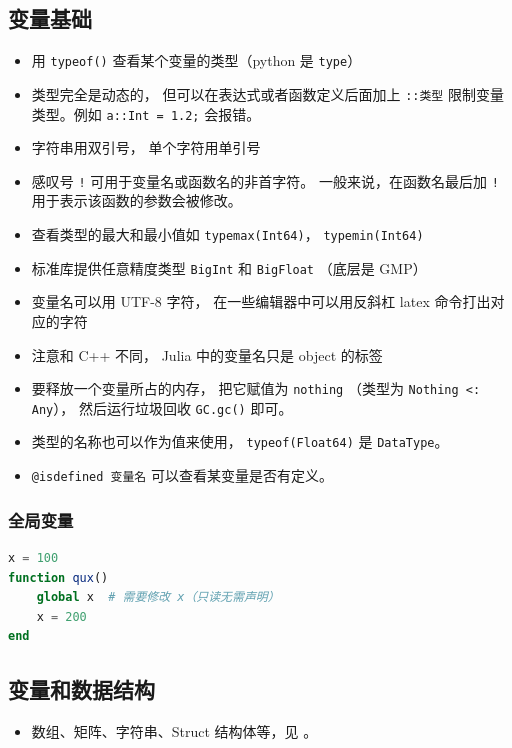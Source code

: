 \subsection{变量基础}
\begin{itemize}
\item 用 \verb`typeof()` 查看某个变量的类型（python 是 \verb`type`）
\item 类型完全是动态的， 但可以在表达式或者函数定义后面加上 \verb`::类型` 限制变量类型。例如 \verb`a::Int = 1.2;` 会报错。
\item 字符串用双引号， 单个字符用单引号
\item 感叹号 \verb`!` 可用于变量名或函数名的非首字符。 一般来说，在函数名最后加 \verb`!` 用于表示该函数的参数会被修改。
\item 查看类型的最大和最小值如 \verb`typemax(Int64)`， \verb`typemin(Int64)`
\item 标准库提供任意精度类型 \verb`BigInt` 和 \verb`BigFloat` （底层是 GMP）
\item 变量名可以用 UTF-8 字符， 在一些编辑器中可以用反斜杠 latex 命令打出对应的字符
\item 注意和 C++ 不同， Julia 中的变量名只是 object 的标签
\item 要释放一个变量所占的内存， 把它赋值为 \verb`nothing` （类型为 \verb`Nothing <: Any`）， 然后运行垃圾回收 \verb`GC.gc()` 即可。
\item 类型的名称也可以作为值来使用， \verb`typeof(Float64)` 是 \verb`DataType`。
\item \verb`@isdefined 变量名` 可以查看某变量是否有定义。
\end{itemize}

\subsubsection{全局变量}
\begin{lstlisting}[language=julia]
x = 100
function qux()
    global x  # 需要修改 x（只读无需声明）
    x = 200
end
\end{lstlisting}

\subsection{变量和数据结构}
\begin{itemize}
\item 数组、矩阵、字符串、Struct 结构体等，见 。
\end{itemize}



